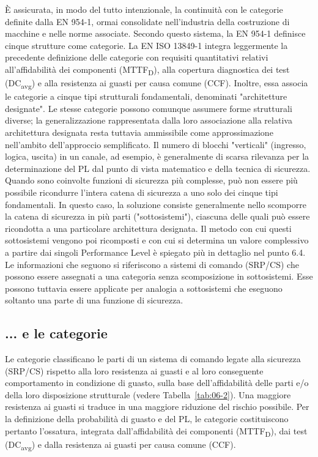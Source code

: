 È assicurata, in modo del tutto intenzionale, la continuità con le categorie definite dalla EN 954-1, ormai consolidate nell'industria della costruzione di macchine e nelle norme associate. Secondo questo sistema, la EN 954-1 definisce cinque strutture come categorie. La EN ISO 13849-1 integra leggermente la precedente definizione delle categorie con requisiti quantitativi relativi all'affidabilità dei componenti (MTTF\textsubscript{D}), alla copertura diagnostica dei test (DC\textsubscript{avg}) e alla resistenza ai guasti per causa comune (CCF). Inoltre, essa associa le categorie a cinque tipi strutturali fondamentali, denominati "architetture designate". Le stesse categorie possono comunque assumere forme strutturali diverse; la generalizzazione rappresentata dalla loro associazione alla relativa architettura designata resta tuttavia ammissibile come approssimazione nell'ambito dell'approccio semplificato. Il numero di blocchi "verticali" (ingresso, logica, uscita) in un canale, ad esempio, è generalmente di scarsa rilevanza per la determinazione del PL dal punto di vista matematico e della tecnica di sicurezza. Quando sono coinvolte funzioni di sicurezza più complesse, può non essere più possibile ricondurre l'intera catena di sicurezza a uno solo dei cinque tipi fondamentali. In questo caso, la soluzione consiste generalmente nello scomporre la catena di sicurezza in più parti ("sottosistemi"), ciascuna delle quali può essere ricondotta a una particolare architettura designata. Il metodo con cui questi sottosistemi vengono poi ricomposti e con cui si determina un valore complessivo a partire dai singoli Performance Level è spiegato più in dettaglio nel punto 6.4. Le informazioni che seguono si riferiscono a sistemi di comando (SRP/CS) che possono essere assegnati a una categoria senza scomposizione in sottosistemi. Esse possono tuttavia essere applicate per analogia a sottosistemi che eseguono soltanto una parte di una funzione di sicurezza.

\subsection{... e le categorie}
\label{subsec:06-2-2}
Le categorie classificano le parti di un sistema di comando legate alla sicurezza (SRP/CS) rispetto alla loro resistenza ai guasti e al loro conseguente comportamento in condizione di guasto, sulla base dell'affidabilità delle parti e/o della loro disposizione strutturale (vedere Tabella~\ref{tab:06-2}). Una maggiore resistenza ai guasti si traduce in una maggiore riduzione del rischio possibile. Per la definizione della probabilità di guasto e del PL, le categorie costituiscono pertanto l'ossatura, integrata dall'affidabilità dei componenti (MTTF\textsubscript{D}), dai test (DC\textsubscript{avg}) e dalla resistenza ai guasti per causa comune (CCF).

